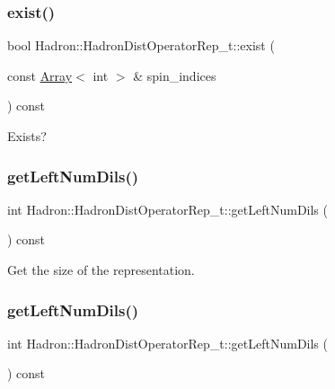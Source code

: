 \subsubsection{\texorpdfstring{exist()}{exist()}\hspace{0.1cm}{\footnotesize\ttfamily [8/8]}}
{\footnotesize\ttfamily bool Hadron\+::\+Hadron\+Dist\+Operator\+Rep\+\_\+t\+::exist (\begin{DoxyParamCaption}\item[{const \mbox{\hyperlink{classXMLArray_1_1Array}{Array}}$<$ int $>$ \&}]{spin\+\_\+indices }\end{DoxyParamCaption}) const}



Exists? 

\mbox{\label{classHadron_1_1HadronDistOperatorRep__t_a03543084705a6d1349dfd54b79e0aef9}} 
\subsubsection{\texorpdfstring{getLeftNumDils()}{getLeftNumDils()}\hspace{0.1cm}{\footnotesize\ttfamily [1/2]}}
{\footnotesize\ttfamily int Hadron\+::\+Hadron\+Dist\+Operator\+Rep\+\_\+t\+::get\+Left\+Num\+Dils (\begin{DoxyParamCaption}{ }\end{DoxyParamCaption}) const}



Get the size of the representation. 

\mbox{\label{classHadron_1_1HadronDistOperatorRep__t_a03543084705a6d1349dfd54b79e0aef9}} 
\subsubsection{\texorpdfstring{getLeftNumDils()}{getLeftNumDils()}\hspace{0.1cm}{\footnotesize\ttfamily [2/2]}}
{\footnotesize\ttfamily int Hadron\+::\+Hadron\+Dist\+Operator\+Rep\+\_\+t\+::get\+Left\+Num\+Dils (\begin{DoxyParamCaption}{ }\end{DoxyParamCaption}) const}



